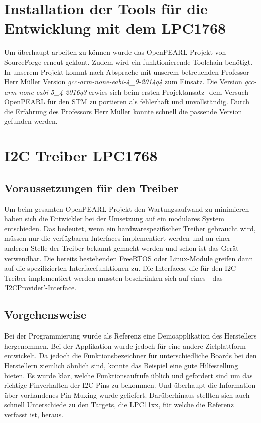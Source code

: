 \section{Installation der Tools für die Entwicklung mit dem LPC1768}
Um überhaupt arbeiten zu können wurde das OpenPEARL-Projekt von SourceForge erneut geklont. Zudem wird ein funktionierende Toolchain benötigt. In unserem Projekt kommt nach Absprache mit unserem betreuenden Professor Herr Müller Version {\textit{gcc-arm-none-eabi-4\_9-2014q4}}
 zum Einsatz. 
Die Version {\textit{gcc-arm-none-eabi-5\_4-2016q3}}
 erwies sich beim ersten Projektansatz- dem Versuch OpenPEARL für den STM zu portieren als fehlerhaft und unvollständig. Durch die Erfahrung des Professors Herr Müller konnte schnell die passende Version gefunden werden.

\newpage
\section{I2C Treiber LPC1768}
\subsection{Voraussetzungen für den Treiber}
Um beim gesamten OpenPEARL-Projekt den Wartungsaufwand zu minimieren haben sich die Entwickler bei der Umsetzung auf ein modulares System entschieden. Das bedeutet, wenn ein hardwarespezifischer Treiber gebraucht wird, müssen nur die verfügbaren Interfaces implementiert werden und an einer anderen Stelle der Treiber bekannt gemacht werden und schon ist das Gerät verwendbar. Die bereits bestehenden FreeRTOS oder Linux-Module greifen dann auf die spezifizierten Interfacefunktionen zu. 
Die Interfaces, die für den I2C-Treiber implementiert werden mussten beschränken sich auf eines - das 'I2CProvider'-Interface.
\subsection{Vorgehensweise}
Bei der Programmierung wurde als Referenz eine Demoapplikation des Herstellers hergenommen. Bei der Applikation wurde jedoch für eine andere Zielplattform entwickelt. Da jedoch die Funktionsbezeichner für unterschiedliche Boards bei den Herstellern ziemlich ähnlich sind, konnte das Beispiel eine gute Hilfestellung bieten. Es wurde klar, welche Funktionsaufrufe üblich und gefordert sind um das richtige Pinverhalten der I2C-Pins zu bekommen. Und überhaupt die Information über vorhandenes Pin-Muxing wurde geliefert. Darüberhinaus stellten sich auch schnell Unterschiede zu den Targets, die LPC11xx, für welche die Referenz verfasst ist, heraus.

